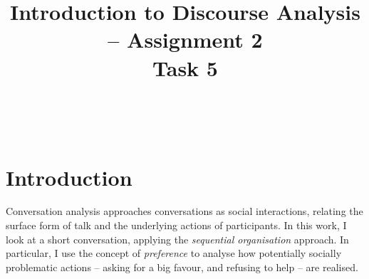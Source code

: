 \documentclass[11pt]{article}
\title{\LARGE Introduction to Discourse Analysis -- Assignment 2 \\ Task 5}
\date{}
\author{}
\begin{document}
\maketitle

\,
\vspace{-5em}






\section*{Introduction}{
	Conversation analysis 
	approaches conversations as social interactions, relating the surface form of talk and the underlying actions of participants.
	In this work, I look at a short conversation, applying the \textit{sequential organisation} approach. In particular, I use the concept of \textit{preference} to analyse how potentially socially problematic actions -- asking for a big favour, and refusing to help -- are realised.
}
\end{document}
